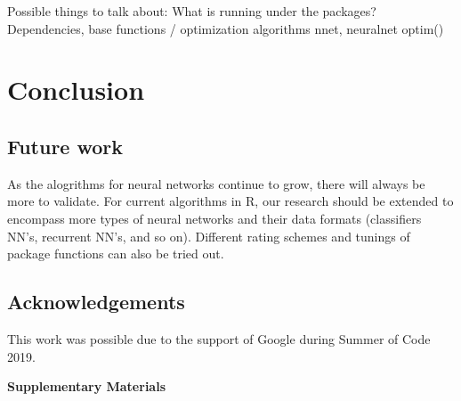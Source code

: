 Possible things to talk about: What is running under the packages?
Dependencies, base functions / optimization algorithms nnet, neuralnet
optim() \textbar{}  \citep{R-optimx}

\hypertarget{conclusion}{%
\section{Conclusion}\label{conclusion}}

\hypertarget{future-work}{%
\subsection{Future work}\label{future-work}}

As the alogrithms for neural networks continue to grow, there will
always be more to validate. For current algorithms in R, our research
should be extended to encompass more types of neural networks and their
data formats (classifiers NN's, recurrent NN's, and so on). Different
rating schemes and tunings of package functions can also be tried out.

\hypertarget{acknowledgements}{%
\subsection{Acknowledgements}\label{acknowledgements}}

This work was possible due to the support of Google during Summer of
Code 2019.



\newpage

\textbf{Supplementary Materials}

